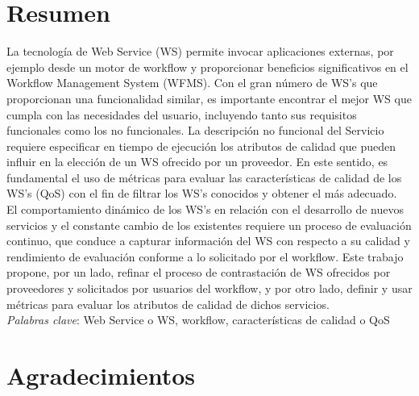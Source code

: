 \chapter*{Resumen}


La tecnología de Web Service (WS) permite invocar aplicaciones externas, por ejemplo desde un motor de workflow y proporcionar beneficios significativos en el Workflow Management System (WFMS). Con el gran número de WS's que proporcionan una funcionalidad similar, es importante encontrar el mejor WS que cumpla con las necesidades del usuario, incluyendo tanto sus requisitos funcionales como los no funcionales. 
La descripción no funcional del Servicio requiere especificar en tiempo de ejecución los atributos de calidad que pueden influir en la elección de un WS ofrecido por un proveedor. En este sentido, es fundamental el uso de métricas para evaluar las características de calidad de los WS's (QoS) con el fin de filtrar los WS's conocidos y obtener el más adecuado.\\
El comportamiento dinámico de los WS’s en relación con el desarrollo de nuevos servicios y el constante cambio de los existentes requiere un proceso de evaluación continuo, que conduce a capturar información del WS con respecto a su calidad y rendimiento de evaluación conforme a lo solicitado por el workflow. Este trabajo propone, por un lado, refinar el proceso de contrastación de WS ofrecidos por proveedores y solicitados por usuarios del workflow, y por otro lado, definir y usar métricas para evaluar los atributos de calidad de dichos servicios.\\

\emph{Palabras clave}: Web Service o WS, workflow, características de calidad o QoS

\thispagestyle{empty} %

\chapter*{Agradecimientos}

